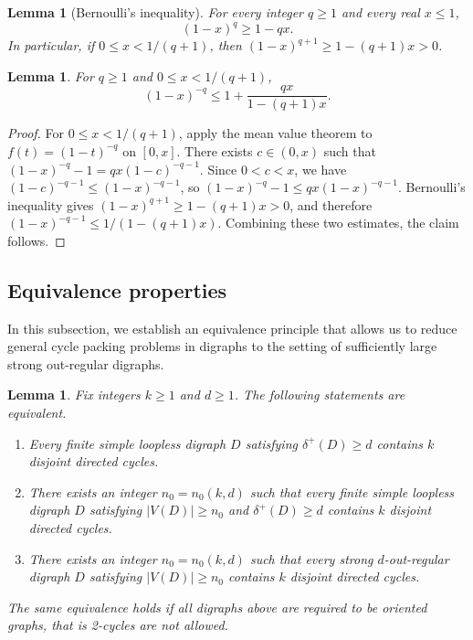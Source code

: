 \documentclass[10pt,a4paper]{article}
\newtheorem{lemma}[theorem]{Lemma}
\numberwithin{equation}{section}
\begin{document}
\begin{lemma}[Bernoulli's inequality]\label{lem:bernoulli}
For every integer $q\ge1$ and every real $x\le1$,
$$
(1-x)^q\ge1-qx.
$$
In particular, if $0\le x<1/(q+1)$, then
$(1-x)^{q+1}\ge1-(q+1)x>0$.
\end{lemma}


\begin{lemma}\label{lem:mvt}
For $q\ge1$ and $0\le x<1/(q+1)$,
$$
(1-x)^{-q}\le1+\frac{qx}{1-(q+1)x}.
$$
\end{lemma}
\begin{proof}
For $0\le x<1/(q+1)$, apply the mean value theorem to $f(t)=(1-t)^{-q}$ on $[0,x]$. There exists $c\in(0,x)$ such that
$
(1-x)^{-q}-1 = qx(1-c)^{-q-1}.
$
Since $0<c<x$, we have $(1-c)^{-q-1}\le (1-x)^{-q-1}$, so
$
(1-x)^{-q}-1\le qx(1-x)^{-q-1}.
$
Bernoulli's inequality gives $(1-x)^{q+1}\ge1-(q+1)x>0$, and therefore
$(1-x)^{-q-1}\le1/(1-(q+1)x)$. Combining these two estimates, the claim follows.
\end{proof}


\subsection{Equivalence properties}\label{subsec:equivalence}

In this subsection, we establish an equivalence principle that allows us to reduce general cycle packing problems in digraphs to the setting of sufficiently large strong out-regular digraphs.


\begin{lemma} \label{lem:large-order-equivalence}
Fix integers $k\ge1$ and $d\ge1$. The following statements are equivalent.
\begin{enumerate}
    \item[\textup{(i)}] Every finite simple loopless digraph $D$ satisfying $\delta^+(D)\ge d $ contains $k$ disjoint directed cycles.
    \item[\textup{(ii)}] There exists an integer $n_0=n_0(k,d)$ such that every finite simple loopless digraph $D$ satisfying $|V(D)|\ge n_0 $ and $\delta^+(D)\ge d $ contains $k$ disjoint directed cycles.
    \item[\textup{(iii)}] There exists an integer $n_0=n_0(k,d)$ such that every strong $d$-out-regular digraph $D$ satisfying $|V(D)|\ge n_0 $ contains $k$ disjoint directed cycles.
\end{enumerate}
The same equivalence holds if all digraphs above are required to be oriented graphs, that is 2-cycles are not allowed.
\end{lemma}
\end{document}
